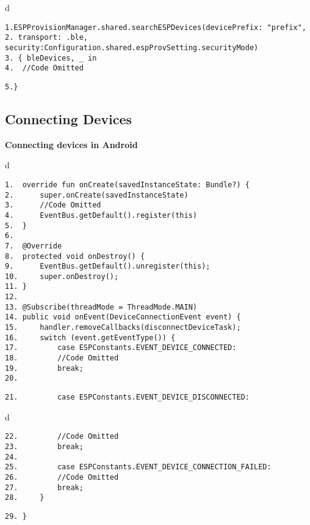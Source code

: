 \documentclass[a4paper,12pt]{book}
\begin{document}
\begin{codebloc}
\begin{tabular}{d}
\vspace{2pt}
\begin{verbatim}
1.ESPProvisionManager.shared.searchESPDevices(devicePrefix: "prefix",
2. transport: .ble, security:Configuration.shared.espProvSetting.securityMode)
3. { bleDevices, _ in
4.  //Code Omitted
\end{verbatim}
\verb|5.}|
\end{tabular}
\end{codebloc}

\subsection{Connecting Devices}
\textbf{Connecting devices in Android}


\begin{codebloc}
\begin{tabular}{d}
\vspace{2pt}
\begin{verbatim}
1.  override fun onCreate(savedInstanceState: Bundle?) {
2.      super.onCreate(savedInstanceState)
3.      //Code Omitted
4.      EventBus.getDefault().register(this)
5.  }
6.
7.  @Override
8.  protected void onDestroy() {
9.      EventBus.getDefault().unregister(this);
10.     super.onDestroy();
11. }
12.
13. @Subscribe(threadMode = ThreadMode.MAIN)
14. public void onEvent(DeviceConnectionEvent event) {
15.     handler.removeCallbacks(disconnectDeviceTask);
16.     switch (event.getEventType()) {
17.         case ESPConstants.EVENT_DEVICE_CONNECTED:
18.         //Code Omitted
19.         break;
20.
\end{verbatim}
\verb|21.         case ESPConstants.EVENT_DEVICE_DISCONNECTED:|
\end{tabular}
\end{codebloc}

\begin{codebloc}
\begin{tabular}{d}
\vspace{2pt}
\begin{verbatim}
22.         //Code Omitted
23.         break;
24.
25.         case ESPConstants.EVENT_DEVICE_CONNECTION_FAILED:
26.         //Code Omitted
27.         break;
28.     }
\end{verbatim}
\verb|29. }|
\end{tabular}
\end{codebloc}
\end{document}
